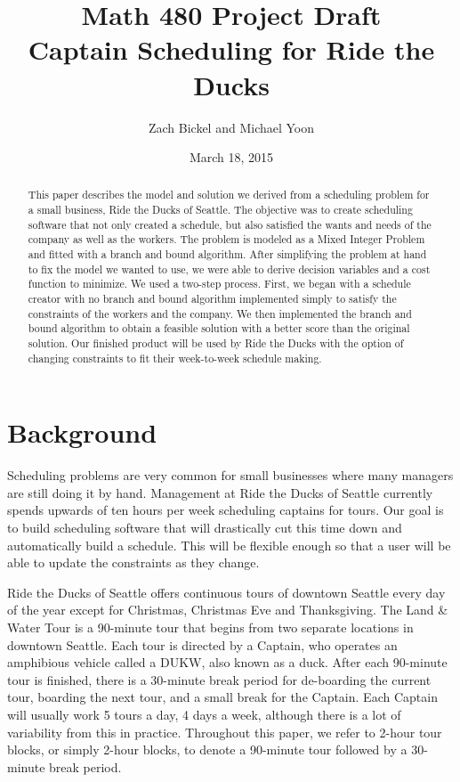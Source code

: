 \documentclass[12pt]{article}
\begin{document}
\title{Math 480 Project Draft \\ Captain Scheduling for Ride the Ducks} 

\author{Zach Bickel and Michael Yoon}
\date{March 18, 2015}
\maketitle

\begin{abstract}
This paper describes the model and solution we derived from a scheduling problem for a 
small business, Ride the Ducks of Seattle. The objective was to create scheduling 
software that not only created a schedule, but also satisfied the wants and needs of the 
company as well as the workers. The problem is modeled as a Mixed Integer Problem 
and fitted with a branch and bound algorithm. After simplifying the problem at hand to 
fix the model we wanted to use, we were able to derive decision variables and a cost 
function to minimize. We used a two-step process. First, we began with a schedule 
creator with no branch and bound algorithm implemented simply to satisfy the constraints of the 
workers and the company. We then implemented the 
branch and bound algorithm to obtain a feasible solution with a better score than the original solution. Our finished product will be used 
by Ride the Ducks with the option of changing constraints to fit their week-to-week 
schedule making.
\end{abstract}


\section*{Background}
Scheduling problems are very common for small businesses where many managers are still doing it by hand. Management at Ride the Ducks of Seattle currently spends upwards of ten hours per week scheduling captains for tours. Our goal is to build scheduling software that will drastically cut this time down and automatically build a schedule. This will be flexible enough so that a user will be able to update the constraints as they change. 

Ride the Ducks of Seattle offers continuous tours of downtown Seattle every day of the year except for Christmas, Christmas Eve and Thanksgiving. The Land \& Water Tour is a 90-minute tour that begins from two separate locations in downtown Seattle. Each tour is directed by a Captain, who operates an amphibious vehicle called a DUKW, also known as a duck. After each 90-minute tour is finished, there is a 30-minute break period for de-boarding the current tour, boarding the next tour, and a small break for the Captain. Each Captain will usually work 5 tours a day, 4 days a week, although there is a lot of variability from this in practice. Throughout this paper, we refer to 2-hour tour blocks, or simply 2-hour blocks, to denote a 90-minute tour followed by a 30-minute break period.
\end{document}
